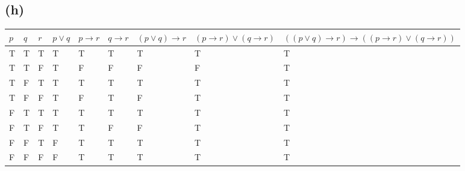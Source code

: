 \documentclass[12pt,leqno,fleqn]{article}
\begin{document}
\subsection*{(h)}

\scriptsize
\begin{tabular}{lll|l|l|l|l|l|l}
    $p$ & $q$ & $r$ & $p \lor q$ & $p \to r$ & $q \to r$ & $(p \lor q) \to r$ & $(p \to r) \lor (q \to r)$ & $((p \lor  q) \to r) \to ((p \to r) \lor (q \to r))$ \\ \hline
    T   & T   & T   & T          & T         & T         & T                  & T                          & T                                                    \\
    T   & T   & F   & T          & F         & F         & F                  & F                          & T                                                    \\
    T   & F   & T   & T          & T         & T         & T                  & T                          & T                                                    \\
    T   & F   & F   & T          & F         & T         & F                  & T                          & T                                                    \\
    F   & T   & T   & T          & T         & T         & T                  & T                          & T                                                    \\
    F   & T   & F   & T          & T         & F         & F                  & T                          & T                                                    \\
    F   & F   & T   & F          & T         & T         & T                  & T                          & T                                                    \\
    F   & F   & F   & F          & T         & T         & T                  & T                          & T                                                   
\end{tabular}
\normalsize
\end{document}
